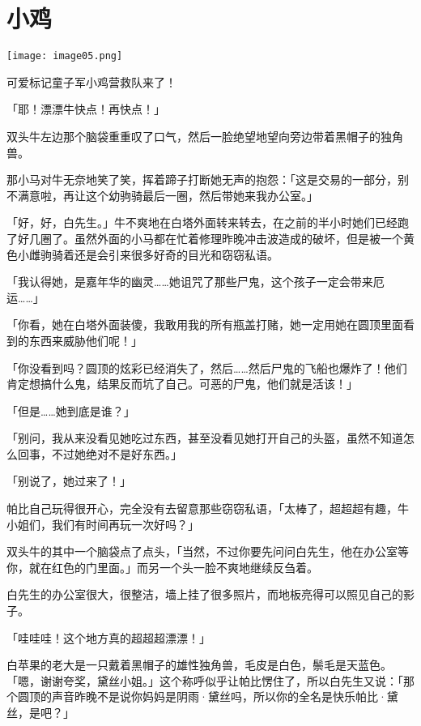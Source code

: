 \chapter{小鸡}

\texttt{[image: image05.png]}

\begin{intro}
可爱标记童子军小鸡营救队来了！
\end{intro}


「耶！漂漂牛快点！再快点！」

双头牛左边那个脑袋重重叹了口气，然后一脸绝望地望向旁边带着黑帽子的独角兽。

那小马对牛无奈地笑了笑，挥着蹄子打断她无声的抱怨：「这是交易的一部分，别不满意啦，再让这个幼驹骑最后一圈，然后带她来我办公室。」

「好，好，白先生。」牛不爽地在白塔外面转来转去，在之前的半小时她们已经跑了好几圈了。虽然外面的小马都在忙着修理昨晚冲击波造成的破坏，但是被一个黄色小雌驹骑着还是会引来很多好奇的目光和窃窃私语。

「我认得她，是嘉年华的幽灵……她诅咒了那些尸鬼，这个孩子一定会带来厄运……」

「你看，她在白塔外面装傻，我敢用我的所有瓶盖打赌，她一定用她在圆顶里面看到的东西来威胁他们呢！」

「你没看到吗？圆顶的炫彩已经消失了，然后……然后尸鬼的飞船也爆炸了！他们肯定想搞什么鬼，结果反而坑了自己。可恶的尸鬼，他们就是活该！」

「但是……她到底是谁？」

「别问，我从来没看见她吃过东西，甚至没看见她打开自己的头盔，虽然不知道怎么回事，不过她绝对不是好东西。」

「别说了，她过来了！」

帕比自己玩得很开心，完全没有去留意那些窃窃私语，「太棒了，超超超有趣，牛小姐们，我们有时间再玩一次好吗？」

双头牛的其中一个脑袋点了点头，「当然，不过你要先问问白先生，他在办公室等你，就在红色的门里面。」而另一个头一脸不爽地继续反刍着。

白先生的办公室很大，很整洁，墙上挂了很多照片，而地板亮得可以照见自己的影子。

「哇哇哇！这个地方真的超超超漂漂！」

白苹果的老大是一只戴着黑帽子的雄性独角兽，毛皮是白色，鬃毛是天蓝色。「嗯，谢谢夸奖，黛丝小姐。」这个称呼似乎让帕比愣住了，所以白先生又说：「那个圆顶的声音昨晚不是说你妈妈是阴雨·黛丝吗，所以你的全名是快乐帕比·黛丝，是吧？」

